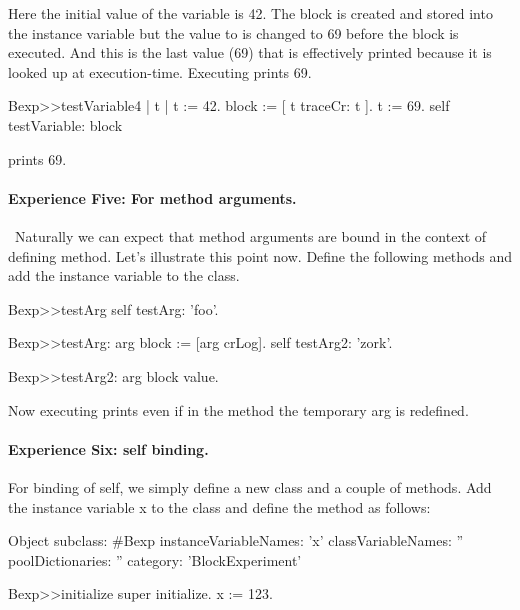 \documentclass[a4paper,10pt,twoside]{book}
\begin{document}
Here the initial value of the variable  is 42. The block is created and stored into the instance variable  but the value to  is changed to 69 before the block is executed. And this is the last value (69) that is effectively printed because it is looked up at execution-time. Executing  prints 69.



\begin{code}{}
Bexp>>testVariable4
	| t |
	t := 42.
	block := [ t traceCr: t ].
	t := 69.
	self testVariable: block
\end{code}

 prints 69.





\paragraph{Experience Five: For method arguments.}\
Naturally we can expect that method arguments are bound in the context of defining method. Let's illustrate this point now. Define the following methods and add the instance variable  to the class.

\begin{code}{}
Bexp>>testArg
	self testArg: 'foo'.

Bexp>>testArg: arg
	block := [arg crLog].
	self testArg2: 'zork'.

Bexp>>testArg2: arg
	block value.
\end{code}

Now executing  prints  even if in the method  the temporary arg is redefined.

\paragraph{Experience Six: self binding.}
For binding of self, we simply define a new class and a couple of methods.
Add the instance variable x to the class \ct{Bexp} and define the  method as follows:

\begin{code}{}
Object subclass: #Bexp
	instanceVariableNames: 'x'
	classVariableNames: ''
	poolDictionaries: ''
	category: 'BlockExperiment'

Bexp>>initialize
    super initialize.
	x := 123.
\end{code}
\end{document}
